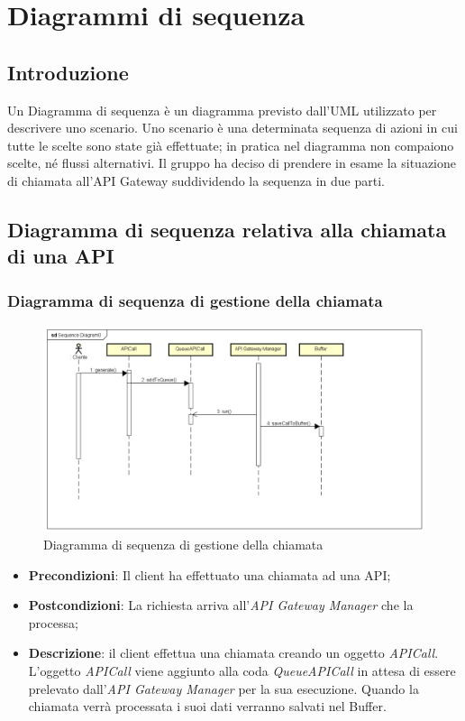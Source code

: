\newpage
\section{Diagrammi di sequenza}
\subsection{Introduzione}
Un Diagramma di sequenza è un diagramma previsto dall'UML utilizzato per descrivere uno scenario.
Uno scenario è una determinata sequenza di azioni in cui tutte le scelte sono state già effettuate; in pratica nel diagramma non compaiono scelte, né flussi alternativi.
Il gruppo ha deciso di prendere in esame la situazione di chiamata all'API Gateway suddividendo la sequenza in due parti.

\subsection{Diagramma di sequenza relativa alla chiamata di una API}
\subsubsection{Diagramma di sequenza di gestione della chiamata}
\begin{figure}[h]
	\centering
	\includegraphics[width=1.0\linewidth]{"IMG/Sequence Diagram0"}
	\caption{Diagramma di sequenza di gestione della chiamata}
\end{figure}

\begin{itemize}
	\item \textbf{Precondizioni}: Il client ha effettuato una chiamata ad una API;
	\item \textbf{Postcondizioni}: La richiesta arriva all'\textit{API Gateway Manager} che la processa;
	\item \textbf{Descrizione}: il client effettua una chiamata creando un oggetto \textit{APICall}. L'oggetto \textit{APICall} viene aggiunto alla coda \textit{QueueAPICall} in attesa di essere prelevato dall'\textit{API Gateway Manager} per la sua esecuzione. Quando la chiamata verrà processata i suoi dati verranno salvati nel Buffer.
\end{itemize}

